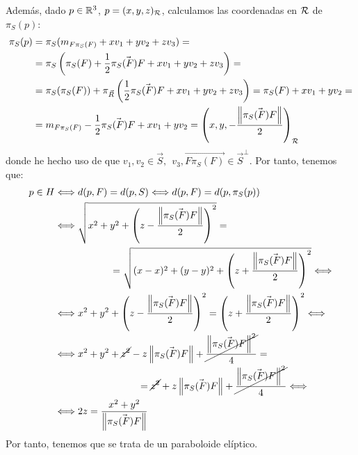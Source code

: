 \documentclass[12pt]{article}
\begin{document}
\begin{ejercicio}[2.5 puntos]
    Además, dado $ p\in \mathbb{R}^3$, $p=(x,y,z)_{\mathcal{R}}$, calculamos las coordenadas en $\mathcal{R}$ de $\pi_S(p)$:
    \begin{align*}
        \pi_S(p) &= \pi_S(m_{F\pi_S(F)} + xv_1 + yv_2+zv_3)
        =\\&= \pi_S\left(\pi_S(F) + \frac{1}{2}\vec{\pi_S(F)F} + xv_1 + yv_2+zv_3\right)
        =\\&= \pi_S(\pi_S(F)) + \pi_{\vec{R}}\left(\frac{1}{2}\vec{\pi_S(F)F} + xv_1 + yv_2+zv_3\right) = \pi_S(F) + xv_1 + yv_2
        =\\&= m_{F\pi_S(F)} -\frac{1}{2}\vec{\pi_S(F)F} + xv_1 + yv_2
        = \left(x,y, -\dfrac{\left\|\vec{\pi_S(F)F}\right\|}{2}\right)_{\mathcal{R}}
    \end{align*}
    donde he hecho uso de que $v_1,v_2\in \vec{S},~~v_3, \vec{F\pi_S(F)} \in \vec{S}^\perp$. Por tanto, tenemos que:
    \begin{align*}
        p\in H &\Longleftrightarrow
        d(p,F) = d(p,S) \Longleftrightarrow d(p, F) = d(p,\pi_S(p)) \\ & \Longleftrightarrow
        \sqrt{x^2 +y^2+ \left(z-\frac{\left\|\vec{\pi_S(F)F}\right\|}{2}\right)^2} =\\&\hspace{2cm}=\sqrt{(x-x)^2 +(y-y)^2 + \left(z+\frac{\left\|\vec{\pi_S(F)F}\right\|}{2}\right)^2} \Longleftrightarrow \\ & \Longleftrightarrow
        x^2+y^2 + \left(z-\frac{\left\|\vec{\pi_S(F)F}\right\|}{2}\right)^2 = \left(z+\frac{\left\|\vec{\pi_S(F)F}\right\|}{2}\right)^2 \Longleftrightarrow \\ & \Longleftrightarrow
        x^2 +y^2 +\cancel{z^2} - z\left\|\vec{\pi_S(F)F}\right\| + \cancel{\frac{\left\|\vec{\pi_S(F)F}\right\|^2}{4}} =\\&\hspace{3cm}=\cancel{z^2} + z\left\|\vec{\pi_S(F)F}\right\| + \cancel{\frac{\left\|\vec{\pi_S(F)F}\right\|^2}{4}} \Longleftrightarrow \\ & \Longleftrightarrow
        2z = \frac{x^2+y^2}{\left\|\vec{\pi_S(F)F}\right\|}
    \end{align*}
    Por tanto, tenemos que se trata de un paraboloide elíptico.\\



\end{ejercicio}
\end{document}
